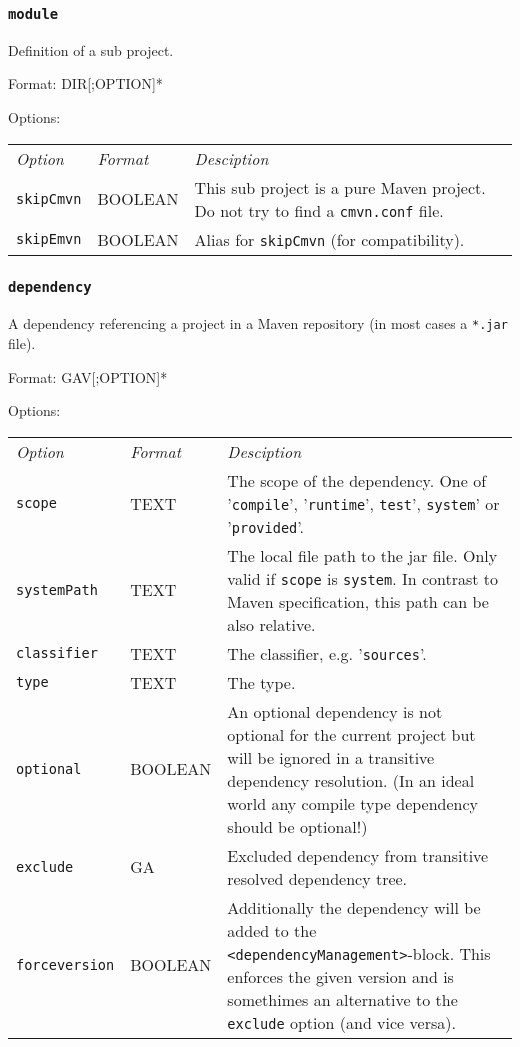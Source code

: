 \documentclass[a4paper,12pt,english,oneside,halfparskip]{scrartcl}
\newcommand{\code}[1]{\texttt{#1}}
\begin{document}
\subsubsection{\code{module}}

Definition of a sub project.

Format: DIR[;OPTION]*

Options:

\begin{tabular}{llp{}}
\emph{Option} & \emph{Format} & \emph{Desciption} \\
\code{skipCmvn} & BOOLEAN & This sub project is a pure Maven project. Do not try to find a \code{cmvn.conf} file. \\
\code{skipEmvn} & BOOLEAN & Alias for \code{skipCmvn} (for compatibility). \\
\end{tabular}

\subsubsection{\code{dependency}}

A dependency referencing a project in a Maven repository (in most cases a \code{*.jar} file).

Format: GAV[;OPTION]*

Options:

\begin{tabular}{llp{}}
\emph{Option} & \emph{Format} & \emph{Desciption} \\
\code{scope} & TEXT & The scope of the dependency. One of '\code{compile}', '\code{runtime}', \code{test}', \code{system}' or '\code{provided}'. \\
\code{systemPath} & TEXT & The local file path to the jar file. Only valid if \code{scope} is \code{system}. In contrast to Maven specification, this path can be also relative. \\
\code{classifier} & TEXT & The classifier, e.g. '\code{sources}'. \\
\code{type} & TEXT &  The type. \\
\code{optional} & BOOLEAN & An optional dependency is not optional for the current project but will be ignored in a transitive dependency resolution. (In an ideal world any compile type dependency should be optional!) \\
\code{exclude} & GA & Excluded dependency from transitive resolved dependency tree. \\
\code{forceversion} & BOOLEAN & Additionally the dependency will be added to the \code{<dependencyManagement>}-block. This enforces the given version and is somethimes an alternative to the \code{exclude} option (and vice versa). \\
\end{tabular}
\end{document}
